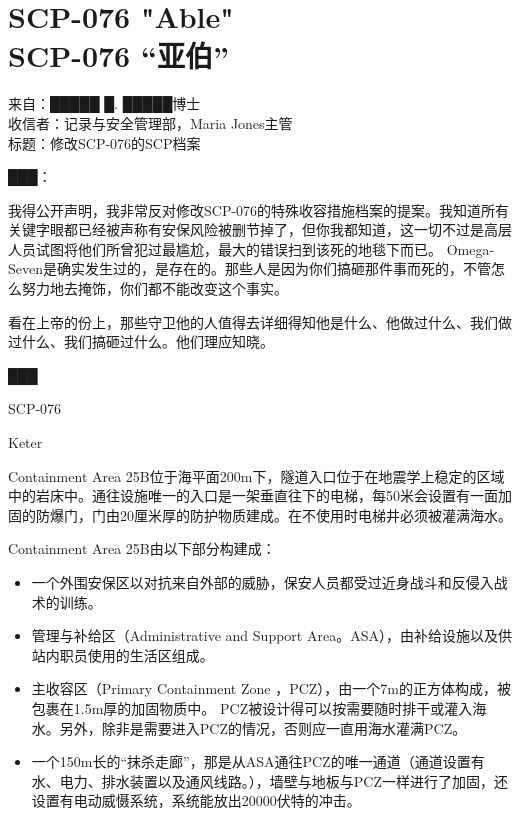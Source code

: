 \chapter[SCP-076 “亚伯”]{
    SCP-076 "Able"\\
    SCP-076 “亚伯”\\
    \heritage
}

\label{chap:SCP-076}

\begin{scpbox}

来自：█████ █. █████博士\\
收信者：记录与安全管理部，Maria Jones主管\\
标题：修改SCP-076的SCP档案

███：

我得公开声明，我非常反对修改SCP-076的特殊收容措施档案的提案。我知道所有关键字眼都已经被声称有安保风险被删节掉了，但你我都知道，这一切不过是高层人员试图将他们所曾犯过最尴尬，最大的错误扫到该死的地毯下而已。 Omega-Seven是确实发生过的，是存在的。那些人是因为你们搞砸那件事而死的，不管怎么努力地去掩饰，你们都不能改变这个事实。

看在上帝的份上，那些守卫他的人值得去详细得知他是什么、他做过什么、我们做过什么、我们搞砸过什么。他们理应知晓。

███

\end{scpbox}

\hr

SCP-076

Keter

Containment Area 25B位于海平面200m下，隧道入口位于在地震学上稳定的区域中的岩床中。通往设施唯一的入口是一架垂直往下的电梯，每50米会设置有一面加固的防爆门，门由20厘米厚的防护物质建成。在不使用时电梯井必须被灌满海水。

Containment Area 25B由以下部分构建成：

\begin{itemize}
\item 一个外围安保区以对抗来自外部的威胁，保安人员都受过近身战斗和反侵入战术的训练。
\item 管理与补给区（Administrative and Support Area。ASA），由补给设施以及供站内职员使用的生活区组成。
\item 主收容区（Primary Containment Zone ，PCZ），由一个7m的正方体构成，被包裹在1.5m厚的加固物质中。 PCZ被设计得可以按需要随时排干或灌入海水。另外，除非是需要进入PCZ的情况，否则应一直用海水灌满PCZ。
\item 一个150m长的“抹杀走廊”，那是从ASA通往PCZ的唯一通道（通道设置有水、电力、排水装置以及通风线路。），墙壁与地板与PCZ一样进行了加固，还设置有电动威慑系统，系统能放出20000伏特的冲击。
\end{itemize}

